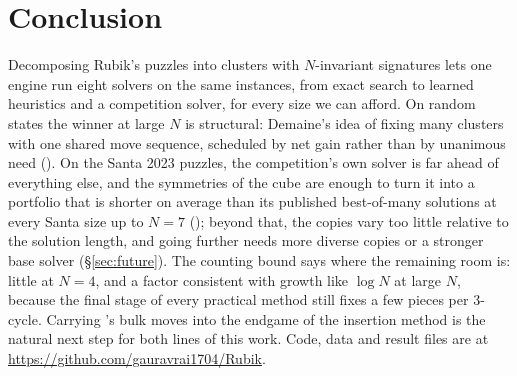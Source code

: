 \section{Conclusion}

Decomposing Rubik's puzzles into clusters with $N$-invariant signatures lets one engine run eight solvers on the same instances,
from exact search to learned heuristics and a competition solver, for every size we can afford. On random states the winner at
large $N$ is structural: Demaine's idea of fixing many clusters with one shared move sequence, scheduled by net gain rather than
by unanimous need (\FiveC). On the Santa 2023 puzzles, the competition's own solver is far ahead of everything else, and the
symmetries of the cube are enough to turn it into a portfolio that is shorter on average than its published best-of-many
solutions at every Santa size up to $N=7$ (\Mseven); beyond that, the copies vary too little relative to the solution length, and
going further needs more diverse copies or a stronger base solver (\S\ref{sec:future}). The
counting bound says where the remaining room is: little at $N=4$, and a factor consistent with growth like $\log N$ at large $N$, because the
final stage of every practical method still fixes a few pieces per 3-cycle. Carrying \FiveC's bulk moves into the endgame of the
insertion method is the natural next step for both lines of this work. Code, data and result files are
at \url{https://github.com/gauravrai1704/Rubik}.
